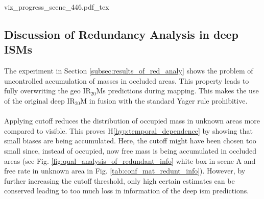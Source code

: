 \begin{center}
		{viz_progress_scene_446.pdf_tex}
\end{center}
%
\subsection{Discussion of Redundancy Analysis in deep ISMs}
\label{subsec:discussion_of_red_analy}
The experiment in Section \ref{subsec:results_of_red_analy} shows the problem of uncontrolled accumulation of masses in occluded areas. This property leads to fully overwriting the geo IR$_{20}$Ms predictions during mapping. This makes the use of the original deep IR$_{20}$M in fusion with the standard Yager rule prohibitive. 
\\\\
Applying cutoff reduces the distribution of occupied mass in unknown areas more compared to visible. This proves H\ref{hyp:temporal_dependence} by showing that small biases are being accumulated. Here, the cutoff might have been chosen too small since, instead of occupied, now free mass is being accumulated in occluded areas (see Fig. \ref{fig:qual_analysis_of_redundant_info} white box in scene A and free rate in unknown area in Fig. \ref{tab:conf_mat_redunt_info}). However, by further increasing the cutoff threshold, only high certain estimates can be conserved leading to too much loss in information of the deep \gls{ism} predictions. 
\\\\
